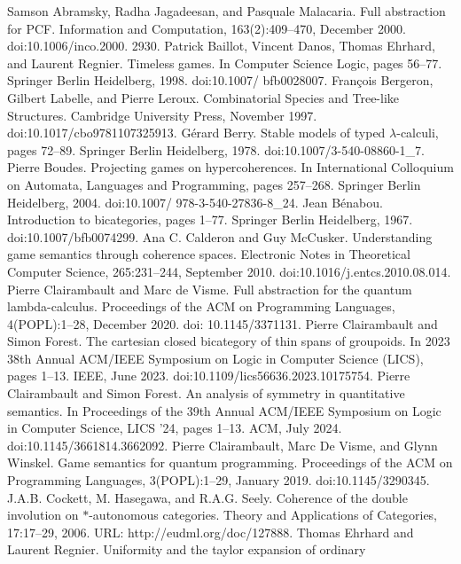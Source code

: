  Samson Abramsky, Radha Jagadeesan, and Pasquale Malacaria. Full abstraction for PCF.
Information and Computation, 163(2):409–470, December 2000. doi:10.1006/inco.2000.
2930.
 Patrick Baillot, Vincent Danos, Thomas Ehrhard, and Laurent Regnier. Timeless games.
In Computer Science Logic, pages 56–77. Springer Berlin Heidelberg, 1998. doi:10.1007/
bfb0028007.
 François Bergeron, Gilbert Labelle, and Pierre Leroux. Combinatorial Species and Tree-like
Structures. Cambridge University Press, November 1997. doi:10.1017/cbo9781107325913.
 Gérard Berry. Stable models of typed \ensuremath{\lambda}-calculi, pages 72–89. Springer Berlin Heidelberg, 1978.
doi:10.1007/3-540-08860-1\_7.
 Pierre Boudes. Projecting games on hypercoherences. In International Colloquium on Automata,
Languages and Programming, pages 257–268. Springer Berlin Heidelberg, 2004. doi:10.1007/
978-3-540-27836-8\_24.
 Jean Bénabou. Introduction to bicategories, pages 1–77. Springer Berlin Heidelberg, 1967.
doi:10.1007/bfb0074299.
 Ana C. Calderon and Guy McCusker. Understanding game semantics through coherence
spaces. Electronic Notes in Theoretical Computer Science, 265:231–244, September 2010.
doi:10.1016/j.entcs.2010.08.014.
 Pierre Clairambault and Marc de Visme. Full abstraction for the quantum lambda-calculus.
Proceedings of the ACM on Programming Languages, 4(POPL):1–28, December 2020. doi:
10.1145/3371131.
 Pierre Clairambault and Simon Forest. The cartesian closed bicategory of thin spans of
groupoids. In 2023 38th Annual ACM/IEEE Symposium on Logic in Computer Science
(LICS), pages 1–13. IEEE, June 2023. doi:10.1109/lics56636.2023.10175754.
 Pierre Clairambault and Simon Forest. An analysis of symmetry in quantitative semantics. In
Proceedings of the 39th Annual ACM/IEEE Symposium on Logic in Computer Science, LICS
’24, pages 1–13. ACM, July 2024. doi:10.1145/3661814.3662092.
 Pierre Clairambault, Marc De Visme, and Glynn Winskel. Game semantics for quantum
programming. Proceedings of the ACM on Programming Languages, 3(POPL):1–29, January
2019. doi:10.1145/3290345.
 J.A.B. Cockett, M. Hasegawa, and R.A.G. Seely. Coherence of the double involution on
\ensuremath{*}-autonomous categories. Theory and Applications of Categories, 17:17–29, 2006. URL:
http://eudml.org/doc/127888.
 Thomas Ehrhard and Laurent Regnier. Uniformity and the taylor expansion of ordinary
